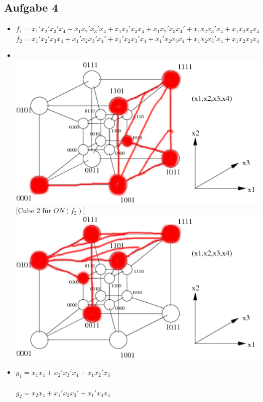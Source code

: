 \documentclass{scrartcl}
\begin{document}
	\subsection*{Aufgabe 4}
	\begin{itemize}
		\item[a)]
		$f_1 = x_1'x_2'x_3'x_4 + x_1x_2'x_3'x_4  + x_1x_2'x_3x_4  + x_1x_2'x_3x_4' + x_1x_2x_3'x_4 + x_1x_2x_3x_4$ \\
		$f_2 = x_1'x_2'x_3x_4  + x_1'x_2x_3'x_4' + x_1'x_2x_3'x_4 + x_1'x_2x_3x_4 + x_1x_2x_3'x_4 + x_1x_2x_3x_4$
		\item[b)] [Cube 1 für $ON(f_1)$] \\
		\includegraphics[width=14cm]{hypercube1.png}
		[Cube 2 für $ON(f_2)$] \\
		\includegraphics[width=14cm]{hypercube2.png}

		\item[c)] $g_1 = x_1x_4 + x_2'x_3'x_4 + x_1x_2'x_3 $ \\
		\\
		$g_2 = x_2x_4 + x_1'x_2x_3' + x_1'x_3x_4 $

	\end{itemize}
\end{document}
